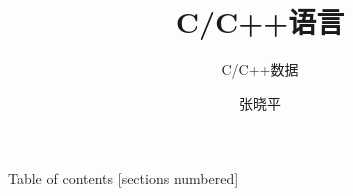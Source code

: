 \documentclass[10pt]{beamer}
\title{C/C++语言}
\subtitle{C/C++数据}
\date{}%
\author{张晓平}
\institute{武汉大学数学与统计学院}
\newcommand\Fontvi{\fontsize{6.5}{7.2}\selectfont}
\begin{document}
\maketitle

\begin{frame}{Table of contents}
  [sections numbered]
  \tableofcontents[hideallsubsections]
\end{frame}






\end{document}
